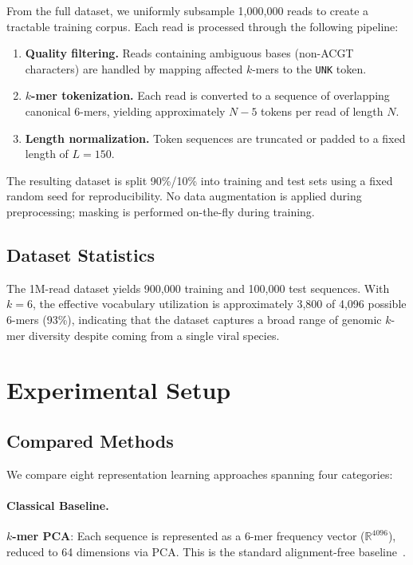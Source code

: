 \documentclass[pmlr]{jmlr}%
\begin{document}
From the full dataset, we uniformly subsample 1,000,000 reads to create a tractable training corpus. Each read is processed through the following pipeline:
\begin{enumerate}
    \item \textbf{Quality filtering.} Reads containing ambiguous bases (non-ACGT characters) are handled by mapping affected $k$-mers to the \texttt{UNK} token.
    \item \textbf{$k$-mer tokenization.} Each read is converted to a sequence of overlapping canonical 6-mers, yielding approximately $N - 5$ tokens per read of length $N$.
    \item \textbf{Length normalization.} Token sequences are truncated or padded to a fixed length of $L = 150$.
\end{enumerate}

The resulting dataset is split 90\%/10\% into training and test sets using a fixed random seed for reproducibility. No data augmentation is applied during preprocessing; masking is performed on-the-fly during training.

\subsection{Dataset Statistics}
The 1M-read dataset yields 900,000 training and 100,000 test sequences. With $k = 6$, the effective vocabulary utilization is approximately 3,800 of 4,096 possible 6-mers (93\%), indicating that the dataset captures a broad range of genomic $k$-mer diversity despite coming from a single viral species.

\section{Experimental Setup}
\label{sec:experiments}

\subsection{Compared Methods}

We compare eight representation learning approaches spanning four categories:

\paragraph{Classical Baseline.}
\textbf{$k$-mer PCA}: Each sequence is represented as a 6-mer frequency vector ($\mathbb{R}^{4096}$), reduced to 64 dimensions via PCA. This is the standard alignment-free baseline~\citep{sims2009alignment}.
\end{document}
